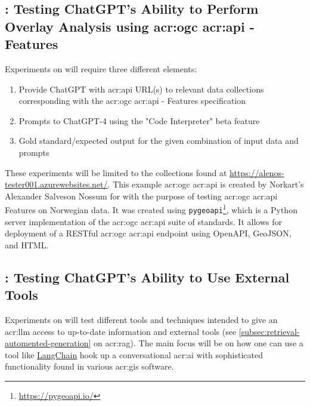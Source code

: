 \subsection[RQ2: Testing ChatGPT's Ability to Perform Overlay Analysis using OGC API - Features]{: Testing ChatGPT's Ability to Perform Overlay Analysis using \acrshort{acr:ogc} \acrshort{acr:api} - Features}

Experiments on  will require three different elements:

\begin{enumerate}
    \item Provide ChatGPT with \acrshort{acr:api} URL(s) to relevant data collections corresponding with the \acrshort{acr:ogc} \acrshort{acr:api} - Features specification
    \item Prompts to ChatGPT-4 using the "Code Interpreter" beta feature
    \item Gold standard/expected output for the given combination of input data and prompts
\end{enumerate}

These experiments will be limited to the collections found at \url{https://alenos-tester001.azurewebsites.net/}. This example \acrshort{acr:ogc} \acrshort{acr:api} is created by Norkart's Alexander Salveson Nossum for with the purpose of testing \acrshort{acr:ogc} \acrshort{acr:api} Features on Norwegian data. It was created using \texttt{pygeoapi}\footnote{\url{https://pygeoapi.io/}}, which is a Python server implementation of the \acrshort{acr:ogc} \acrshort{acr:api} suite of standards. It allows for deployment of a RESTful \acrshort{acr:ogc} \acrshort{acr:api} endpoint using OpenAPI, GeoJSON, and HTML.

\subsection[RQ3: Testing ChatGPT's Ability to To Use External Tools]{: Testing ChatGPT's Ability to Use External Tools}

Experiments on  will test different tools and techniques intended to give an \acrshort{acr:llm} access to up-to-date information and external tools (see \autoref{subsec:retrieval-automented-generation} on \acrlong{acr:rag}). The main focus will be on how one can use a tool like \hyperref[subsubsec:langchain]{LangChain} hook up a conversational \acrshort{acr:ai} with sophisticated functionality found in various \acrshort{acr:gis} software.

